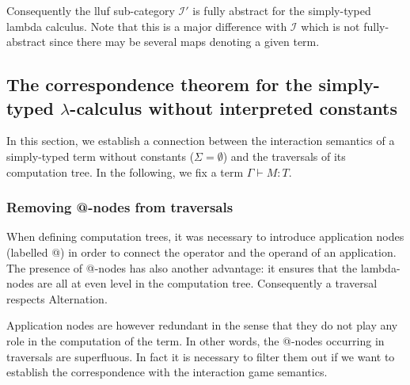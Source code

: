 Consequently the lluf sub-category $\mathcal{I'}$ is fully abstract for the simply-typed lambda calculus.
Note that this is a major difference with $\mathcal{I}$ which is not fully-abstract since there may be several maps denoting a given
term.





\subsection{The correspondence theorem for the simply-typed $\lambda$-calculus without interpreted constants}
In this section, we establish a
connection between the interaction semantics of a simply-typed term without constants ($\Sigma = \emptyset$)
and the traversals of its computation tree. In the following, we fix a term $\Gamma \vdash M : T$.

\subsubsection{Removing @-nodes from traversals}

When defining computation trees, it was necessary to introduce
application nodes (labelled @) in order to connect the operator and
the operand of an application. The presence of @-nodes has also
another advantage: it ensures that the lambda-nodes are all at even
level in the computation tree. Consequently a traversal respects
Alternation.

Application nodes are however redundant in the sense that they do
not play any role in the computation of the term. In other words,
the @-nodes occurring in traversals are superfluous. In fact it is
necessary to filter them out if we want to establish the
correspondence with the interaction game semantics.

